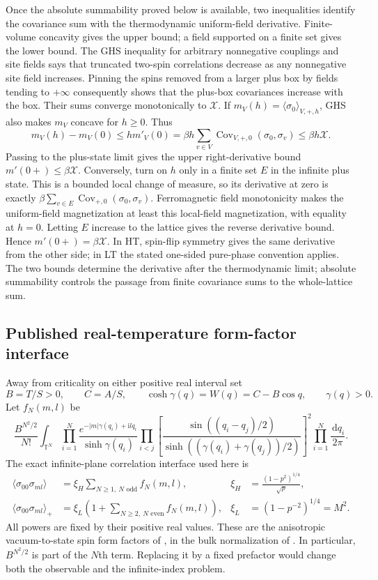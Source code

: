 \documentclass[11pt]{article}
\numberwithin{equation}{section}
\theoremstyle{definition}
\newcommand{\T}{\mathbb T}
\newcommand{\dd}{\,\mathrm d}
\newcommand{\ii}{\mathrm i}
\begin{document}
Once the absolute summability proved below is available, two inequalities
identify the covariance sum with the thermodynamic uniform-field derivative.
Finite-volume concavity gives the upper bound; a field supported on a
finite set gives the lower bound. The GHS inequality for arbitrary
nonnegative couplings and site fields \cite[Theorem 1.5]{CGN} says that
truncated two-spin correlations decrease as any nonnegative site field
increases. Pinning the spins removed from a larger plus box by fields
tending to $+\infty$ consequently shows that the plus-box covariances
increase with the box. Their sums converge monotonically to $\mathcal X$.
If $m_V(h)=\langle\sigma_0\rangle_{V,+,h}$, GHS also makes $m_V$
concave for $h\ge0$. Thus
\[
 m_V(h)-m_V(0)\le h m'_V(0)
 =\beta h\sum_{v\in V}\operatorname{Cov}_{V,+,0}(\sigma_0,\sigma_v)
 \le\beta h\mathcal X.
\]
Passing to the plus-state limit gives the upper right-derivative bound
$m'(0+)\le\beta\mathcal X$. Conversely, turn on $h$ only in a finite
set $E$ in the infinite plus state. This is a bounded local change of
measure, so its derivative at zero is exactly
$\beta\sum_{v\in E}\operatorname{Cov}_{+,0}(\sigma_0,\sigma_v)$.
Ferromagnetic field monotonicity makes the uniform-field magnetization
at least this local-field magnetization, with equality at $h=0$.
Letting $E$ increase to the lattice gives the reverse derivative bound.
Hence $m'(0+)=\beta\mathcal X$. In HT, spin-flip symmetry gives the
same derivative from the other side; in LT the stated one-sided
pure-phase convention applies. The two bounds determine the derivative after the thermodynamic limit;
absolute summability controls the passage from finite covariance sums
to the whole-lattice sum.

\subsection{Published real-temperature form-factor interface}
Away from criticality on either positive real interval set
\[
 B=T/S>0,\qquad C=A/S,\qquad
 \cosh\gamma(q)=W(q)=C-B\cos q,\qquad \gamma(q)>0.
\]
Let $f_N(m,l)$ be
\begin{equation}\label{eq:corrFF}
 \frac{B^{N^2/2}}{N!}\int_{\T^N}
 \prod_{i=1}^N\frac{e^{-|m|\gamma(q_i)+\ii lq_i}}{\sinh\gamma(q_i)}
 \prod_{i<j}\left[
 \frac{\sin((q_i-q_j)/2)}{\sinh((\gamma(q_i)+\gamma(q_j))/2)}
 \right]^2\prod_{i=1}^N\frac{\dd q_i}{2\pi}.
\end{equation}
The exact infinite-plane correlation interface used here is
\begin{align}
 \langle\sigma_{00}\sigma_{ml}\rangle
   &=\xi_H\sum_{N\ge1,\ N\text{ odd}}f_N(m,l),
   &\xi_H&=\frac{(1-p^2)^{1/4}}{\sqrt p},\label{eq:HTcorr}\\
 \langle\sigma_{00}\sigma_{ml}\rangle_+
   &=\xi_L\left(1+\sum_{N\ge2,\ N\text{ even}}f_N(m,l)\right),
   &\xi_L&=(1-p^{-2})^{1/4}=M^2.\label{eq:LTcorr}
\end{align}
All powers are fixed by their positive real values. These are the
anisotropic vacuum-to-state spin form factors of
\cite{BL,IL}, in the bulk normalization of \cite{ONGP}. In particular,
$B^{N^2/2}$ is part of the $N$th term. Replacing it by a fixed prefactor
would change both the observable and the infinite-index problem.
\end{document}
